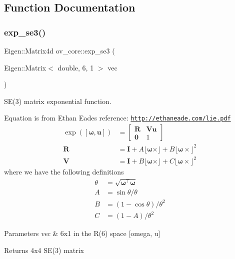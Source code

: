 \subsection{Function Documentation}
\mbox{\label{namespaceov__core_a8907fdb4273f23741299fb23a1c1f572}} 
\subsubsection{\texorpdfstring{exp\+\_\+se3()}{exp\_se3()}}
{\footnotesize\ttfamily Eigen\+::\+Matrix4d ov\+\_\+core\+::exp\+\_\+se3 (\begin{DoxyParamCaption}\item[{Eigen\+::\+Matrix$<$ double, 6, 1 $>$}]{vec }\end{DoxyParamCaption})\hspace{0.3cm}{\ttfamily [inline]}}



S\+E(3) matrix exponential function. 

Equation is from Ethan Eade\textquotesingle{}s reference\+: \href{http://ethaneade.com/lie.pdf}{\tt http\+://ethaneade.\+com/lie.\+pdf} \begin{align*} \exp([\boldsymbol\omega,\mathbf u])&=\begin{bmatrix} \mathbf R & \mathbf V \mathbf u \\ \mathbf 0 & 1 \end{bmatrix} \\[1em] \mathbf R &= \mathbf I + A \lfloor \boldsymbol\omega \times\rfloor + B \lfloor \boldsymbol\omega \times\rfloor^2 \\ \mathbf V &= \mathbf I + B \lfloor \boldsymbol\omega \times\rfloor + C \lfloor \boldsymbol\omega \times\rfloor^2 \end{align*} where we have the following definitions \begin{align*} \theta &= \sqrt{\boldsymbol\omega^\top\boldsymbol\omega} \\ A &= \sin\theta/\theta \\ B &= (1-\cos\theta)/\theta^2 \\ C &= (1-A)/\theta^2 \end{align*}


\begin{DoxyParams}{Parameters}
{\em vec} & 6x1 in the R(6) space \mbox{[}omega, u\mbox{]} \\
\hline
\end{DoxyParams}
\begin{DoxyReturn}{Returns}
4x4 S\+E(3) matrix 
\end{DoxyReturn}
\mbox{\label{namespaceov__core_a835a207e29f0e50ddbf66d8ddce47514}} 
